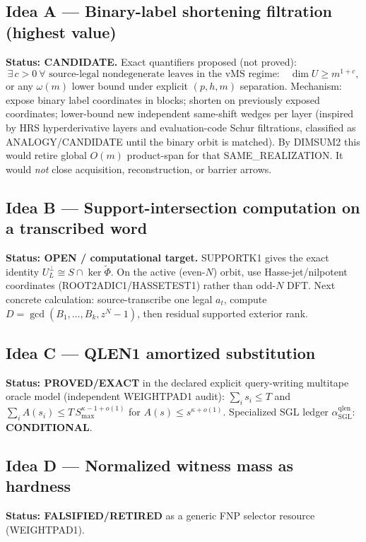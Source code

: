 \documentclass[11pt]{article}
\begin{document}
\subsection*{Idea A --- Binary-label shortening filtration (highest value)}
\textbf{Status: CANDIDATE.}
Exact quantifiers proposed (not proved):
\[
\exists\,c>0\ \forall\text{ source-legal nondegenerate leaves in the vMS regime:}\quad
\dim U\ge m^{1+c},
\]
or any $\omega(m)$ lower bound under explicit $(p,h,m)$ separation.
Mechanism: expose binary label coordinates in blocks; shorten on previously exposed coordinates;
lower-bound new independent same-shift wedges per layer (inspired by HRS hyperderivative layers
and evaluation-code Schur filtrations, classified as ANALOGY/CANDIDATE until the binary orbit
is matched). By DIMSUM2 this would retire global $O(m)$ product-span for that SAME\_REALIZATION.
It would \emph{not} close acquisition, reconstruction, or barrier arrows.

\subsection*{Idea B --- Support-intersection computation on a transcribed word}
\textbf{Status: OPEN / computational target.}
SUPPORTK1 gives the exact identity $U_L^\perp\cong S\cap\ker\widetilde\Phi$.
On the active (even-$N$) orbit, use Hasse-jet/nilpotent coordinates (ROOT2ADIC1/HASSETEST1)
rather than odd-$N$ DFT. Next concrete calculation: source-transcribe one legal $a_t$, compute
$D=\gcd(B_1,\ldots,B_k,z^N-1)$, then residual supported exterior rank.

\subsection*{Idea C --- QLEN1 amortized substitution}
\textbf{Status: PROVED/EXACT} in the declared explicit query-writing multitape oracle model
(independent WEIGHTPAD1 audit): $\sum_i s_i\le T$ and
$\sum_i A(s_i)\le T\,S_{\max}^{\kappa-1+o(1)}$ for $A(s)\le s^{\kappa+o(1)}$.
Specialized SGL ledger $\alpha_{\mathrm{SGL}}^{\mathrm{qlen}}$: \textbf{CONDITIONAL}.

\subsection*{Idea D --- Normalized witness mass as hardness}
\textbf{Status: FALSIFIED/RETIRED} as a generic FNP selector resource (WEIGHTPAD1).
\end{document}
